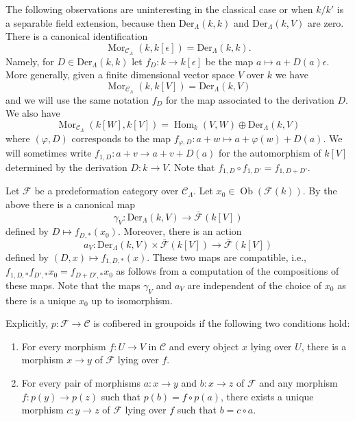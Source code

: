 \documentclass{amsart}
\theoremstyle{plain}
\theoremstyle{definition}
\theoremstyle{remark}
\numberwithin{equation}{subsection}
\def\Hom{\mathop{\mathrm{Hom}}\nolimits}
\def\Mor{\mathop{\mathrm{Mor}}\nolimits}
\def\Ob{\mathop{\mathrm{Ob}}\nolimits}
\begin{document}
\noindent
The following observations are uninteresting in the classical case or when
$k/k'$ is a separable field extension, because then
$\text{Der}_\Lambda(k, k)$ and $\text{Der}_\Lambda(k, V)$ are zero.
There is a canonical identification
$$
\Mor_{\mathcal{C}_\Lambda}(k, k[\epsilon]) =
\text{Der}_\Lambda(k, k).
$$
Namely, for $D \in \text{Der}_\Lambda(k, k)$ let $f_D : k \to k[\epsilon]$
be the map $a \mapsto a + D(a)\epsilon$. More generally, given a finite
dimensional vector space $V$ over $k$ we have
$$
\Mor_{\mathcal{C}_\Lambda}(k, k[V]) =
\text{Der}_\Lambda(k, V)
$$
and we will use the same notation $f_D$ for the map associated to the
derivation $D$. We also have
$$
\Mor_{\mathcal{C}_\Lambda}(k[W], k[V]) =
\Hom_k(V, W) \oplus \text{Der}_\Lambda(k, V)
$$
where $(\varphi, D)$ corresponds to the map
$f_{\varphi, D} : a + w \mapsto a + \varphi(w) + D(a)$. We will sometimes write
$f_{1, D} : a + v \to a + v + D(a)$ for the automorphism
of $k[V]$ determined by the derivation $D : k \to V$. Note that
$f_{1, D} \circ f_{1, D'} = f_{1, D + D'}$.

\medskip\noindent
Let $\mathcal{F}$ be a predeformation category over $\mathcal{C}_\Lambda$.
Let $x_0 \in \Ob(\mathcal{F}(k))$. By the above there is a canonical
map
$$
\gamma_V :
\text{Der}_\Lambda(k, V)
\longrightarrow
\overline{\mathcal{F}}(k[V])
$$
defined by $D \mapsto f_{D, *}(x_0)$. Moreover, there is an action
$$
a_V : \text{Der}_\Lambda(k, V) \times \overline{\mathcal{F}}(k[V])
\longrightarrow
\overline{\mathcal{F}}(k[V])
$$
defined by $(D, x) \mapsto f_{1, D, *}(x)$. These two maps are compatible,
i.e., $f_{1, D, *}f_{D', *}x_0 = f_{D + D', *}x_0$ as follows from a
computation of the compositions of these maps. Note that the maps
$\gamma_V$ and $a_V$ are independent of the choice of $x_0$ as there
is a unique $x_0$ up to isomorphism.


\noindent
Explicitly, $p: \mathcal{F} \to \mathcal{C}$ is cofibered in groupoids if
the following two conditions hold:
\begin{enumerate}
\item For every morphism $f: U \to V$ in $\mathcal{C}$ and every object
$x$ lying over $U$, there is a morphism $x \to y$ of $\mathcal{F}$ lying
over $f$.
\item For every pair of morphisms $a: x \to y$ and $b: x \to z$
of $\mathcal{F}$ and any morphism $f: p(y) \to p(z)$ such that $p(b) = f
\circ p(a)$, there exists a unique morphism $c: y \to z$ of $\mathcal
F$ lying over $f$ such that $b = c \circ a$.
\end{enumerate}
\end{document}
